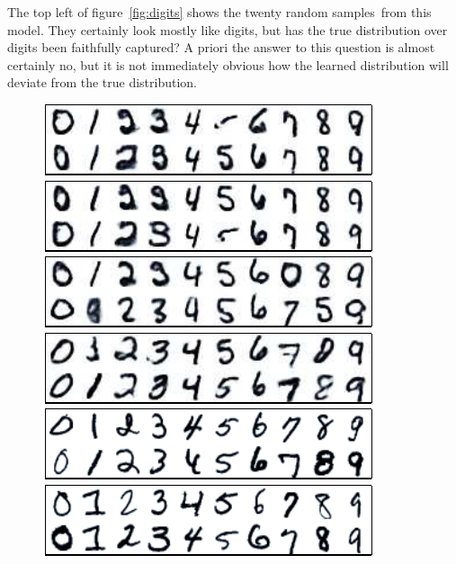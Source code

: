 \documentclass{article} %
\begin{document}
The top left of figure~\ref{fig:digits} shows the twenty random samples\footnotemark~from this model.
They certainly look mostly like digits, but has the true distribution over digits been faithfully captured?
A priori the answer to this question is almost certainly no, but it is not immediately obvious how the learned distribution will deviate from the true distribution.

\begin{figure}[ht]
\centering
\includegraphics[width=0.48\columnwidth]{figures/rbm_samples}
\includegraphics[width=0.48\columnwidth]{figures/rbm_witness_troughs}
\\
\includegraphics[width=0.48\columnwidth]{figures/many_rbm_cond_witness_troughs}
\includegraphics[width=0.48\columnwidth]{figures/dbn_ft_cond_witness_troughs}
\\
\includegraphics[width=0.48\columnwidth]{figures/many_rbm_cond_witness_peaks}
\includegraphics[width=0.48\columnwidth]{figures/dbn_ft_cond_witness_peaks}

\end{figure}
\end{document}
